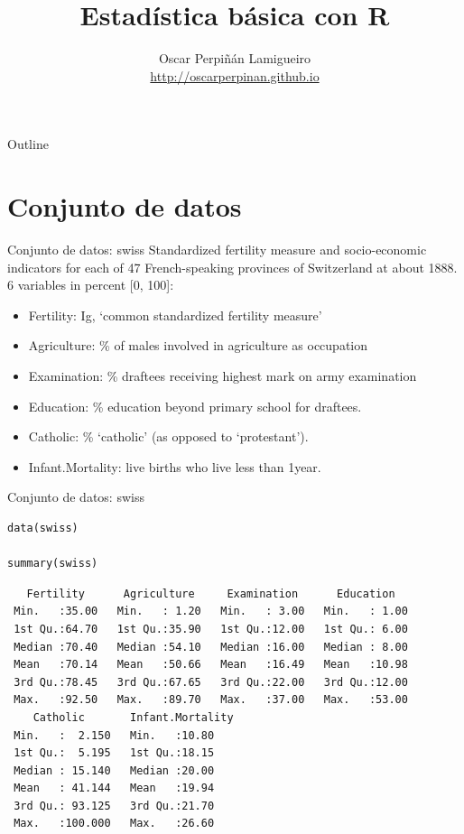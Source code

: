 \documentclass[xcolor={usenames,svgnames,dvipsnames}]{beamer}
\author{Oscar Perpiñán Lamigueiro \\ \url{http://oscarperpinan.github.io}}
\date{}
\title{Estadística básica con R}
\begin{document}
\maketitle
\begin{frame}{Outline}
\tableofcontents
\end{frame}


\section{Conjunto de datos}
\label{sec-1}

\begin{frame}[label=sec-1-1]{Conjunto de datos: swiss}
Standardized fertility measure and socio-economic indicators for
each of 47 French-speaking provinces of Switzerland at
about 1888. 6 variables in percent [0, 100]:

\begin{itemize}
\item \alert{Fertility}:         Ig, ‘common standardized fertility measure’
\item \alert{Agriculture}:       \% of males involved in agriculture as occupation
\item \alert{Examination}:       \% draftees receiving highest mark on army examination
\item \alert{Education}:         \% education beyond primary school for draftees.
\item \alert{Catholic}:          \% ‘catholic’ (as opposed to ‘protestant’).
\item \alert{Infant.Mortality}:  live births who live less than 1year.
\end{itemize}
\end{frame}

\begin{frame}[fragile,label=sec-1-2]{Conjunto de datos: swiss}
 \lstset{language=R,label= ,caption= ,numbers=none}
\begin{lstlisting}
data(swiss)

summary(swiss)
\end{lstlisting}

\begin{verbatim}
   Fertility      Agriculture     Examination      Education    
 Min.   :35.00   Min.   : 1.20   Min.   : 3.00   Min.   : 1.00  
 1st Qu.:64.70   1st Qu.:35.90   1st Qu.:12.00   1st Qu.: 6.00  
 Median :70.40   Median :54.10   Median :16.00   Median : 8.00  
 Mean   :70.14   Mean   :50.66   Mean   :16.49   Mean   :10.98  
 3rd Qu.:78.45   3rd Qu.:67.65   3rd Qu.:22.00   3rd Qu.:12.00  
 Max.   :92.50   Max.   :89.70   Max.   :37.00   Max.   :53.00  
    Catholic       Infant.Mortality
 Min.   :  2.150   Min.   :10.80   
 1st Qu.:  5.195   1st Qu.:18.15   
 Median : 15.140   Median :20.00   
 Mean   : 41.144   Mean   :19.94   
 3rd Qu.: 93.125   3rd Qu.:21.70   
 Max.   :100.000   Max.   :26.60
\end{verbatim}
\end{frame}
\end{document}
